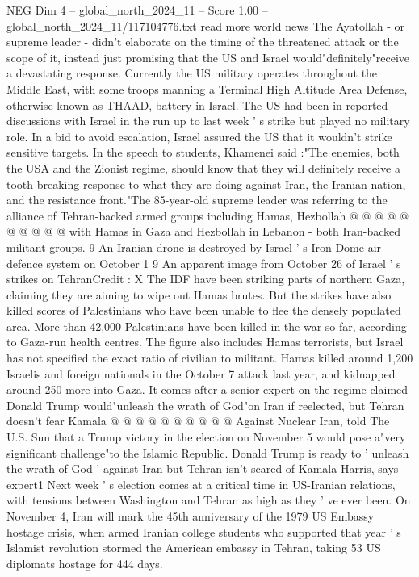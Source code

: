 \begin{textsample}{NEG Dim 4 – global\_north\_2024\_11 – Score 1.00 – global\_north\_2024\_11/117104776.txt}  \label{ex:f4_neg_174}
read more world news The Ayatollah - or supreme leader - didn't elaborate on the timing of the threatened attack or the scope of it, instead just promising that the US and Israel would"definitely"receive a devastating response.
Currently the US military operates throughout the Middle East, with some troops manning a Terminal High Altitude Area Defense, otherwise known as THAAD, battery in Israel.
The US had been in reported discussions with Israel in the run up to last week ' s strike but played no military role.
In a bid to avoid escalation, Israel assured the US that it wouldn't strike sensitive targets.
In the speech to students, Khamenei said :"The enemies, both the USA and the Zionist regime, should know that they will definitely receive a tooth-breaking response to what they are doing against Iran, the Iranian nation, and the resistance front."The 85-year-old supreme leader was referring to the alliance of Tehran-backed armed groups including Hamas, Hezbollah @ @ @ @ @ @ @ @ @ @ with Hamas in Gaza and Hezbollah in Lebanon - both Iran-backed militant groups. 9 An Iranian drone is destroyed by Israel ' s Iron Dome air defence system on October 1 9 An apparent image from October 26 of Israel ' s strikes on TehranCredit : X The IDF have been striking parts of northern Gaza, claiming they are aiming to wipe out Hamas brutes.
But the strikes have also killed scores of Palestinians who have been unable to flee the densely populated area.
More than 42,000 Palestinians have been killed in the war so far, according to Gaza-run health centres.
The figure also includes Hamas terrorists, but Israel has not specified the exact ratio of civilian to militant.
Hamas killed around 1,200 Israelis and foreign nationals in the October 7 attack last year, and kidnapped around 250 more into Gaza.
It comes after a senior expert on the regime claimed Donald Trump would"unleash the wrath of God"on Iran if reelected, but Tehran doesn't fear Kamala @ @ @ @ @ @ @ @ @ @ Against Nuclear Iran, told The U.S.
Sun that a Trump victory in the election on November 5 would pose a"very significant challenge"to the Islamic Republic.
Donald Trump is ready to ' unleash the wrath of God ' against Iran but Tehran isn't scared of Kamala Harris, says expert1 Next week ' s election comes at a critical time in US-Iranian relations, with tensions between Washington and Tehran as high as they ' ve ever been.
On November 4, Iran will mark the 45th anniversary of the 1979 US Embassy hostage crisis, when armed Iranian college students who supported that year ' s Islamist revolution stormed the American embassy in Tehran, taking 53 US diplomats hostage for 444 days.

\end{textsample}
